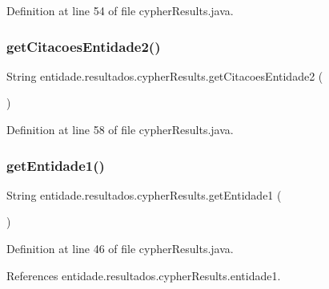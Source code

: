 Definition at line 54 of file cypher\+Results.\+java.

\hypertarget{classentidade_1_1resultados_1_1cypherResults_a8e4a4d50083315d7eb19a55d43c3b2e7}{}\label{classentidade_1_1resultados_1_1cypherResults_a8e4a4d50083315d7eb19a55d43c3b2e7} 
\subsubsection{\texorpdfstring{get\+Citacoes\+Entidade2()}{getCitacoesEntidade2()}}
{\footnotesize\ttfamily String entidade.\+resultados.\+cypher\+Results.\+get\+Citacoes\+Entidade2 (\begin{DoxyParamCaption}{ }\end{DoxyParamCaption})}



Definition at line 58 of file cypher\+Results.\+java.

\hypertarget{classentidade_1_1resultados_1_1cypherResults_a96b375e44f9c6ca3991981adfe5b0ae9}{}\label{classentidade_1_1resultados_1_1cypherResults_a96b375e44f9c6ca3991981adfe5b0ae9} 
\subsubsection{\texorpdfstring{get\+Entidade1()}{getEntidade1()}}
{\footnotesize\ttfamily String entidade.\+resultados.\+cypher\+Results.\+get\+Entidade1 (\begin{DoxyParamCaption}{ }\end{DoxyParamCaption})}



Definition at line 46 of file cypher\+Results.\+java.



References entidade.\+resultados.\+cypher\+Results.\+entidade1.

\hypertarget{classentidade_1_1resultados_1_1cypherResults_a3b71305929339a1feb95b98dc3932158}{}\label{classentidade_1_1resultados_1_1cypherResults_a3b71305929339a1feb95b98dc3932158} 
